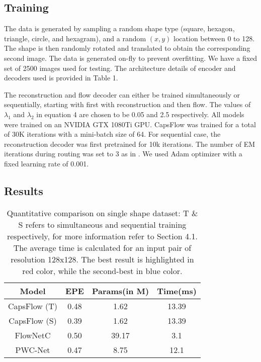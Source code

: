 \documentclass[11pt]{article}
\begin{document}
\subsection{Training}
The data is generated by sampling a random shape type
(square, hexagon, triangle, circle, and hexagram), and a random \((x, y)\) location between 0 to 128. The shape is then
randomly rotated and translated to obtain the corresponding second image. The data is generated on-fly to prevent
overfitting. We have a fixed set of 2500 images used for
testing. The architecture details of encoder and decoders
used is provided in Table 1.

The reconstruction and flow decoder can either be
trained simultaneously or sequentially, starting with first
with reconstruction and then flow. The values of \(\lambda_{1}\) and \(\lambda_{2}\) in equation 4 are chosen to be 0.05 and 2.5 respectively. All models were trained on an NVIDIA GTX 1080Ti GPU. CapsFlow was trained for a total of 30K iterations with a mini-batch size of 64. For sequential case, the reconstruction decoder was first pretrained for 10k iterations. The number of EM iterations during routing was set to 3 as in \cite{5}. We used Adam optimizer \cite{8} with a fixed learning rate of 0.001.

\subsection{Results}

\begin{table}
\begin{center}
\begin{tabular}{ c c c c} 
 \hline
 Model & EPE & Params(in M) & Time(ms) \\
 \hline
 CapsFlow (T) & 0.48 &  1.62 & 13.39\\
 CapsFlow (S) & 0.39 & 1.62 & 13.39\\
 FlowNetC & 0.50 & 39.17 & 3.1\\
 PWC-Net & 0.47 & 8.75 & 12.1\\
 \hline
\end{tabular}
\end{center}
\caption{ Quantitative comparison on single shape dataset: T \& S refers to simultaneous and sequential training respectively, for more information refer to Section 4.1. The average time is calculated for an input pair of resolution 128x128. The best result is highlighted in red color, while the second-best in blue color.}
\end{table}
\end{document}

